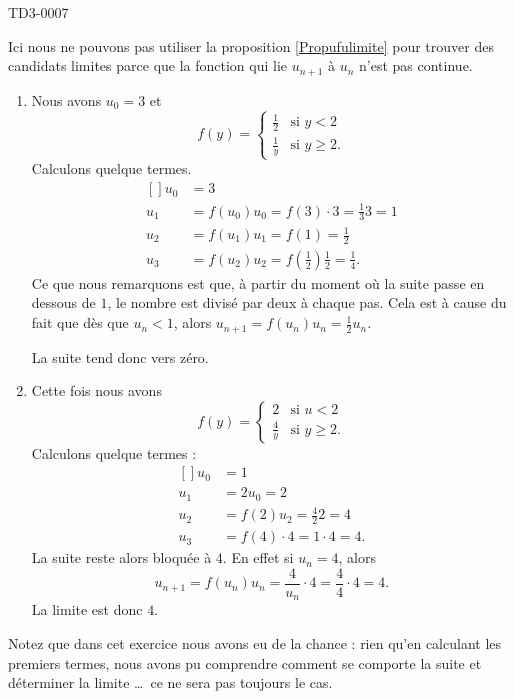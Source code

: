 
\begin{corrige}{TD3-0007}

	Ici nous ne pouvons pas utiliser la proposition \ref{Propufulimite} pour trouver des candidats limites parce que la fonction qui lie $u_{n+1}$ à $u_n$ n'est pas continue.
	\begin{enumerate}
		\item
			Nous avons $u_0=3$ et
			\begin{equation}
				f(y)=\begin{cases}
					\frac{ 1 }{2}	&	\text{si $y<2$}\\
					\frac{1}{ y }	&	 \text{si $y\geq 2$}.
				\end{cases}
			\end{equation}
			Calculons quelque termes.		
			\begin{equation}
				\begin{aligned}[]
					u_0&=3\\
					u_1&=f(u_0)u_0=f(3)\cdot 3=\frac{1}{ 3 }3=1\\
					u_2&=f(u_1)u_1=f(1)=\frac{ 1 }{2}\\
					u_3&=f(u_2)u_2=f(\frac{ 1 }{2})\frac{ 1 }{2}=\frac{1}{ 4 }.
				\end{aligned}
			\end{equation}
			Ce que nous remarquons est que, à partir du moment où la suite passe en dessous de $1$, le nombre est divisé par deux à chaque pas. Cela est à cause du fait que dès que $u_n<1$, alors $u_{n+1}=f(u_n)u_n=\frac{ 1 }{2}u_n$.

			La suite tend donc vers zéro.
		\item
			Cette fois nous avons
			\begin{equation}
				f(y)=\begin{cases}
					2	&	\text{si $u<2$}\\
					\frac{ 4 }{ y }	&	 \text{si $y\geq 2$.}
				\end{cases}
			\end{equation}
			Calculons quelque termes :
			\begin{equation}
				\begin{aligned}[]
					u_0&=1\\
					u_1&=2u_0=2\\
					u_2&=f(2)u_2=\frac{ 4 }{ 2 }2=4\\
					u_3&=f(4)\cdot 4=1\cdot 4=4.
				\end{aligned}
			\end{equation}
			La suite reste alors bloquée à $4$. En effet si $u_n=4$, alors
			\begin{equation}
				u_{n+1}=f(u_n)u_n=\frac{ 4 }{ u_n }\cdot 4=\frac{ 4 }{ 4 }\cdot 4=4.
			\end{equation}
			La limite est donc $4$.
	\end{enumerate}
	
	Notez que dans cet exercice nous avons eu de la chance : rien qu'en calculant les premiers termes, nous avons pu comprendre comment se comporte la suite et déterminer la limite \ldots\ ce ne sera pas toujours le cas.

\end{corrige}
